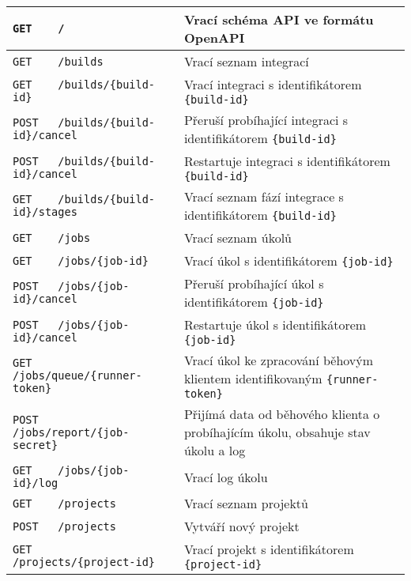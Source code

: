 \begin{sidewaystable}[ht]
\fontsize{7.5}{9.5}\selectfont
\centering
\begin{tabular}{|l|l|}
\hline
\verb|GET    /|                                          & Vrací schéma API ve formátu OpenAPI \\ \hline
\verb|GET    /builds|                                    & Vrací seznam integrací \\ \hline
\verb|GET    /builds/{build-id}|                         & Vrací integraci s identifikátorem \verb|{build-id}| \\ \hline
\verb|POST   /builds/{build-id}/cancel|                  & Přeruší probíhající integraci s identifikátorem \verb|{build-id}| \\ \hline
\verb|POST   /builds/{build-id}/cancel|                  & Restartuje integraci s identifikátorem \verb|{build-id}| \\ \hline
\verb|GET    /builds/{build-id}/stages|                  & Vrací seznam fází integrace s identifikátorem \verb|{build-id}| \\ \hline
\verb|GET    /jobs|                                      & Vrací seznam úkolů \\ \hline
\verb|GET    /jobs/{job-id}|                             & Vrací úkol s identifikátorem \verb|{job-id}| \\ \hline
\verb|POST   /jobs/{job-id}/cancel|                      & Přeruší probíhající úkol s identifikátorem \verb|{job-id}| \\ \hline
\verb|POST   /jobs/{job-id}/cancel|                      & Restartuje úkol s identifikátorem \verb|{job-id}| \\ \hline
\verb|GET    /jobs/queue/{runner-token}|                 & Vrací úkol ke zpracování běhovým klientem identifikovaným \verb|{runner-token}| \\ \hline
\verb|POST   /jobs/report/{job-secret}|                  & Přijímá data od běhového klienta o probíhajícím úkolu, obsahuje stav úkolu a log \\ \hline
\verb|GET    /jobs/{job-id}/log|                         & Vrací log úkolu \\ \hline
\verb|GET    /projects|                                  & Vrací seznam projektů \\ \hline
\verb|POST   /projects|                                  & Vytváří nový projekt \\ \hline
\verb|GET    /projects/{project-id}|                     & Vrací projekt s identifikátorem \verb|{project-id}| \\ \hline

\end{tabular}
\end{sidewaystable}
